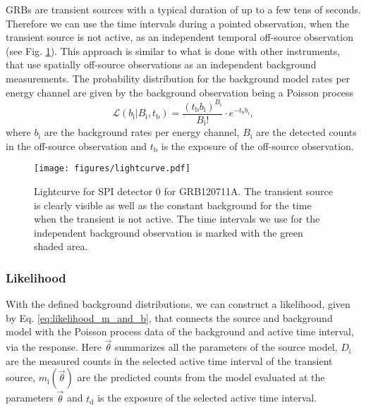 \documentclass[twocolumn]{aa}
\begin{document}
GRBs are transient sources with a typical duration of up to a few tens of seconds. Therefore we can use the time intervals during a pointed observation, when the transient source is not active, as an independent temporal off-source observation (see Fig. \ref{fig:lightcurve}). This approach is similar to what is done with other instruments, that use spatially off-source observations as an independent background measurements. The probability distribution for the background model rates per energy channel are given by the background observation being a Poisson process
\begin{equation}
	\mathcal{L}(b_{\mathrm{i}}|B_{\mathrm{i}}, t_{\mathrm{b}})=\frac{(t_{\mathrm{b}} b_{\mathrm{i}})^{B_{\mathrm{i}}}}{B_{\mathrm{i}}!}\cdot e^{-t_{\mathrm{b}} b_{\mathrm{i}}},
  \label{eq:poisson_bkg}
\end{equation}
where $b_{\mathrm{i}}$ are the background rates per energy channel, $B_{\mathrm{i}}$ are the detected counts in the off-source observation and $t_{\mathrm{b}}$ is the exposure of the off-source observation.
\begin{figure}
    \begin{centering}
        \texttt{[image: figures/lightcurve.pdf]}
        \caption{Lightcurve for SPI detector 0 for GRB120711A. The transient source is clearly visible as well as the constant background for the time when the transient is not active. The time intervals we use for the independent background observation is marked with the green shaded area.}
        \label{fig:lightcurve}
    \end{centering}
\end{figure}



\subsubsection{Likelihood}

With the defined background distributions, we can construct a likelihood, given by Eq. \ref{eq:likelihood_m_and_b}, that connects the source and background model with the Poisson process data of the background and active time interval, via the response. Here $\vec{\theta}$ summarizes all the parameters of the source model, $D_{\mathrm{i}}$ are the measured counts in the selected active time interval of the transient source, $m_{\mathrm{i}}(\vec{\theta})$ are the predicted counts from the model evaluated at the parameters $\vec{\theta}$ and $t_{\mathrm{d}}$ is the exposure of the selected active time interval.
\end{document}
